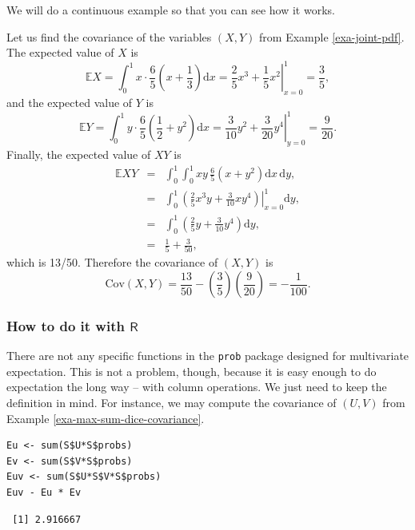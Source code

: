 \documentclass[captions=tableheading]{scrbook}
\begin{document}
We will do a continuous example so that you can see how it works.

\begin{example}

Let us find the covariance of the variables \((X,Y)\) from Example \ref{exa-joint-pdf}. The expected value of \(X\) is
\[
\mathbb{E} X=\int_{0}^{1}x\cdot\frac{6}{5}\left(x+\frac{1}{3}\right)\mathrm{d} x=\left.\frac{2}{5}x^{3}+\frac{1}{5}x^{2}\right|_{x=0}^{1}=\frac{3}{5},
\]
and the expected value of \(Y\) is
\[
\mathbb{E} Y=\int_{0}^{1}y\cdot\frac{6}{5}\left(\frac{1}{2}+y^{2}\right)\mathrm{d} x=\left.\frac{3}{10}y^{2}+\frac{3}{20}y^{4}\right|_{y=0}^{1}=\frac{9}{20}.
\]
Finally, the expected value of \(XY\) is
\begin{eqnarray*}
\mathbb{E} XY & = & \int_{0}^{1}\int_{0}^{1}xy\,\frac{6}{5}\left(x+y^{2}\right)\mathrm{d} x\,\mathrm{d} y,\\
 & = & \int_{0}^{1}\left.\left(\frac{2}{5}x^{3}y+\frac{3}{10}xy^{4}\right)\right|_{x=0}^{1}\mathrm{d} y,\\
 & = & \int_{0}^{1}\left(\frac{2}{5}y+\frac{3}{10}y^{4}\right)\mathrm{d} y,\\
 & = & \frac{1}{5}+\frac{3}{50},
\end{eqnarray*}
which is 13/50. Therefore the covariance of \((X,Y)\) is
\[
\mbox{Cov}(X,Y)=\frac{13}{50}-\left(\frac{3}{5}\right)\left(\frac{9}{20}\right)=-\frac{1}{100}.
\]
\end{example}
\subsubsection{How to do it with \(\mathsf{R}\)}
\label{sec-7-2-1-1}


There are not any specific functions in the \texttt{prob} package designed for multivariate expectation. This is not a problem, though, because it is easy enough to do expectation the long way -- with column operations. We just need to keep the definition in mind. For instance, we may compute the covariance of \((U,V)\) from Example \ref{exa-max-sum-dice-covariance}.


\lstset{language=R}
\begin{lstlisting}
Eu <- sum(S$U*S$probs)
Ev <- sum(S$V*S$probs)
Euv <- sum(S$U*S$V*S$probs)
Euv - Eu * Ev
\end{lstlisting}

\begin{verbatim}
 [1] 2.916667
\end{verbatim}
\end{document}
